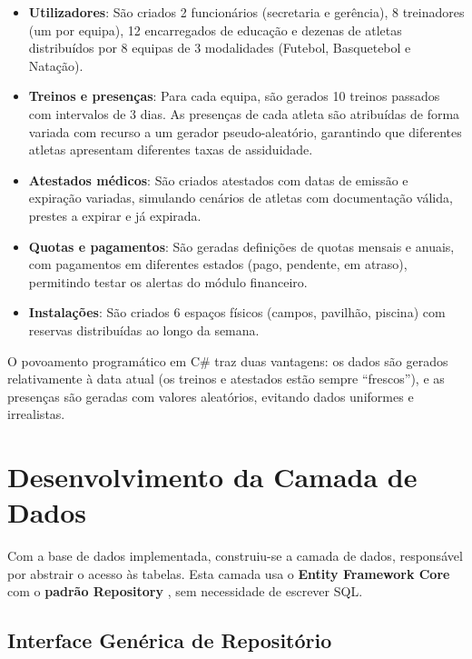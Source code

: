 \begin{itemize}
    \item \textbf{Utilizadores}: São criados 2 funcionários (secretaria e gerência), 8 treinadores (um por equipa), 12 encarregados de educação e dezenas de atletas distribuídos por 8 equipas de 3 modalidades (Futebol, Basquetebol e Natação).
    \item \textbf{Treinos e presenças}: Para cada equipa, são gerados 10 treinos passados com intervalos de 3 dias. As presenças de cada atleta são atribuídas de forma variada com recurso a um gerador pseudo-aleatório, garantindo que diferentes atletas apresentam diferentes taxas de assiduidade.
    \item \textbf{Atestados médicos}: São criados atestados com datas de emissão e expiração variadas, simulando cenários de atletas com documentação válida, prestes a expirar e já expirada.
    \item \textbf{Quotas e pagamentos}: São geradas definições de quotas mensais e anuais, com pagamentos em diferentes estados (pago, pendente, em atraso), permitindo testar os alertas do módulo financeiro.
    \item \textbf{Instalações}: São criados 6 espaços físicos (campos, pavilhão, piscina) com reservas distribuídas ao longo da semana.
\end{itemize}

O povoamento programático em C\# traz duas vantagens: os dados são gerados relativamente à data atual (os treinos e atestados estão sempre ``frescos''), e as presenças são geradas com valores aleatórios, evitando dados uniformes e irrealistas.


\section{Desenvolvimento da Camada de Dados}

Com a base de dados implementada, construiu-se a camada de dados, responsável por abstrair o acesso às tabelas. Esta camada usa o \textbf{Entity Framework Core} com o \textbf{padrão Repository} \cite{fowler2002}, sem necessidade de escrever SQL.

\subsection{Interface Genérica de Repositório}

